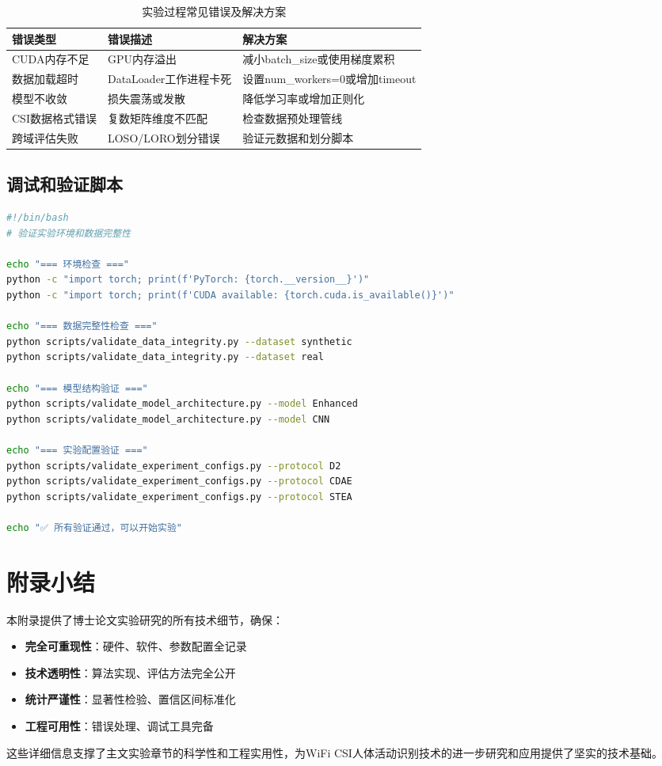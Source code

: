 \begin{table}[h]
\centering
\caption{实验过程常见错误及解决方案}
\label{tab:error_solutions}
\begin{tabular}{p{4cm}p{6cm}p{4cm}}
\toprule
\textbf{错误类型} & \textbf{错误描述} & \textbf{解决方案} \\
\midrule
CUDA内存不足 & GPU内存溢出 & 减小batch\_size或使用梯度累积 \\
数据加载超时 & DataLoader工作进程卡死 & 设置num\_workers=0或增加timeout \\
模型不收敛 & 损失震荡或发散 & 降低学习率或增加正则化 \\
CSI数据格式错误 & 复数矩阵维度不匹配 & 检查数据预处理管线 \\
跨域评估失败 & LOSO/LORO划分错误 & 验证元数据和划分脚本 \\
\bottomrule
\end{tabular}
\end{table}

\subsection{调试和验证脚本}
\label{app:debug_scripts}

\begin{lstlisting}[language=bash, caption=实验验证脚本]
#!/bin/bash
# 验证实验环境和数据完整性

echo "=== 环境检查 ==="
python -c "import torch; print(f'PyTorch: {torch.__version__}')"
python -c "import torch; print(f'CUDA available: {torch.cuda.is_available()}')"

echo "=== 数据完整性检查 ==="
python scripts/validate_data_integrity.py --dataset synthetic
python scripts/validate_data_integrity.py --dataset real

echo "=== 模型结构验证 ==="
python scripts/validate_model_architecture.py --model Enhanced
python scripts/validate_model_architecture.py --model CNN

echo "=== 实验配置验证 ==="
python scripts/validate_experiment_configs.py --protocol D2
python scripts/validate_experiment_configs.py --protocol CDAE
python scripts/validate_experiment_configs.py --protocol STEA

echo "✅ 所有验证通过，可以开始实验"
\end{lstlisting}

\section{附录小结}
\label{app:details_summary}

本附录提供了博士论文实验研究的所有技术细节，确保：
\begin{itemize}
\item \textbf{完全可重现性}：硬件、软件、参数配置全记录
\item \textbf{技术透明性}：算法实现、评估方法完全公开
\item \textbf{统计严谨性}：显著性检验、置信区间标准化
\item \textbf{工程可用性}：错误处理、调试工具完备
\end{itemize}

这些详细信息支撑了主文实验章节的科学性和工程实用性，为WiFi CSI人体活动识别技术的进一步研究和应用提供了坚实的技术基础。